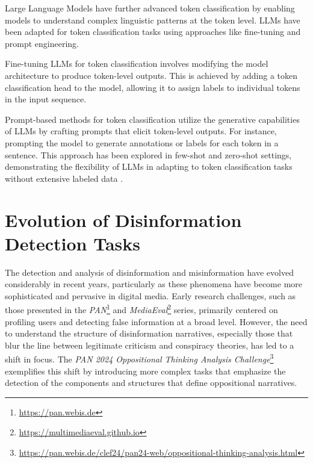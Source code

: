 \documentclass{Configuration_Files/PoliMi3i_thesis}
\begin{document}
Large Language Models have further advanced token classification by enabling models to understand complex linguistic patterns at the token level. LLMs have been adapted for token classification tasks using approaches like fine-tuning and prompt engineering.

Fine-tuning LLMs for token classification involves modifying the model architecture to produce token-level outputs. This is achieved by adding a token classification head to the model, allowing it to assign labels to individual tokens in the input sequence. %

Prompt-based methods for token classification utilize the generative capabilities of LLMs by crafting prompts that elicit token-level outputs. For instance, prompting the model to generate annotations or labels for each token in a sentence. This approach has been explored in few-shot and zero-shot settings, demonstrating the flexibility of LLMs in adapting to token classification tasks without extensive labeled data \cite{grisanti2024named}.


\chapter{Evolution of Disinformation Detection Tasks} \label{chap:oppositional_thinking_tasks} The detection and analysis of disinformation and misinformation have evolved considerably in recent years, particularly as these phenomena have become more sophisticated and pervasive in digital media. Early research challenges, such as those presented in the \textit{PAN}\footnote{\url{https://pan.webis.de}} and \textit{MediaEval}\footnote{\url{https://multimediaeval.github.io}} series, primarily centered on profiling users and detecting false information at a broad level. However, the need to understand the structure of disinformation narratives, especially those that blur the line between legitimate criticism and conspiracy theories, has led to a shift in focus. The \textit{PAN 2024 Oppositional Thinking Analysis Challenge}\footnote{\url{https://pan.webis.de/clef24/pan24-web/oppositional-thinking-analysis.html}} exemplifies this shift by introducing more complex tasks that emphasize the detection of the components and structures that define oppositional narratives.
\end{document}

